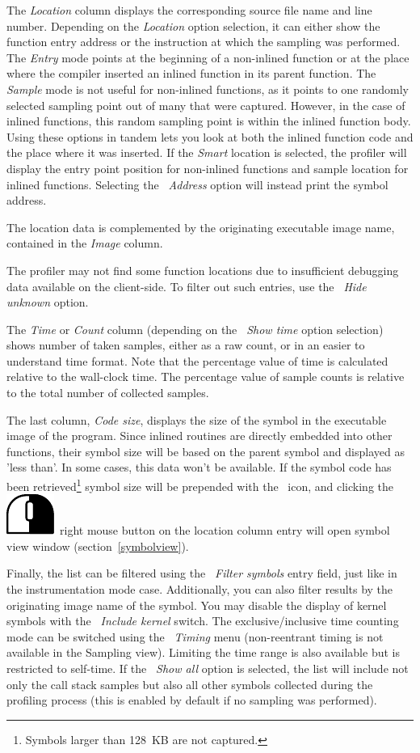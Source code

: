 \documentclass[hidelinks,titlepage,a4paper]{article}
\newcommand{\RMB}{\includegraphics[height=.8\baselineskip]{icons/rmb}}
\begin{document}
The \emph{Location} column displays the corresponding source file name and line number. Depending on the \emph{Location} option selection, it can either show the function entry address or the instruction at which the sampling was performed. The \emph{Entry} mode points at the beginning of a non-inlined function or at the place where the compiler inserted an inlined function in its parent function. The \emph{Sample} mode is not useful for non-inlined functions, as it points to one randomly selected sampling point out of many that were captured. However, in the case of inlined functions, this random sampling point is within the inlined function body. Using these options in tandem lets you look at both the inlined function code and the place where it was inserted. If the \emph{Smart} location is selected, the profiler will display the entry point position for non-inlined functions and sample location for inlined functions. Selecting the \emph{\faAt{}~Address} option will instead print the symbol address.

The location data is complemented by the originating executable image name, contained in the \emph{Image} column.

The profiler may not find some function locations due to insufficient debugging data available on the client-side. To filter out such entries, use the \emph{\faEyeSlash{}~Hide unknown} option.

The \emph{Time} or \emph{Count} column (depending on the \emph{\faStopwatch{}~Show time} option selection) shows number of taken samples, either as a raw count, or in an easier to understand time format. Note that the percentage value of time is calculated relative to the wall-clock time. The percentage value of sample counts is relative to the total number of collected samples.

The last column, \emph{Code size}, displays the size of the symbol in the executable image of the program. Since inlined routines are directly embedded into other functions, their symbol size will be based on the parent symbol and displayed as 'less than'. In some cases, this data won't be available. If the symbol code has been retrieved\footnote{Symbols larger than 128~KB are not captured.} symbol size will be prepended with the \texttt{\faDatabase}~icon, and clicking the \RMB{}~right mouse button on the location column entry will open symbol view window (section~\ref{symbolview}).

Finally, the list can be filtered using the \emph{\faFilter{}~Filter symbols} entry field, just like in the instrumentation mode case. Additionally, you can also filter results by the originating image name of the symbol. You may disable the display of kernel symbols with the \emph{\faHatWizard{}~Include kernel} switch. The exclusive/inclusive time counting mode can be switched using the \emph{~Timing} menu (non-reentrant timing is not available in the Sampling view). Limiting the time range is also available but is restricted to self-time. If the \emph{\faPuzzlePiece{}~Show all} option is selected, the list will include not only the call stack samples but also all other symbols collected during the profiling process (this is enabled by default if no sampling was performed).
\end{document}
